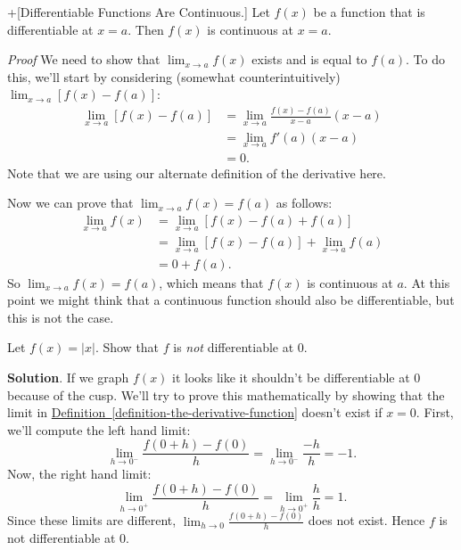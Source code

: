 \documentclass[10pt,]{book}
\makeatletter
\theoremstyle{ptxplainnotitle}
\theoremstyle{ptxplaintitle}
\theoremstyle{ptxplainnotitle}
\theoremstyle{ptxplaintitle}
\theoremstyle{ptxplainnotitle}
\theoremstyle{ptxplaintitle}
\renewcommand*{\proofname}{Proof}
\renewenvironment{proof}[1][\proofname]{\par
  \pushQED{\qed}%
  \normalfont \topsep6\p@\@plus6\p@\relax
  \trivlist
  \item\relax
    {\itshape
    #1\@addpunct{.}}\hspace\labelsep\ignorespaces
}{%
  \popQED\endtrivlist\@endpefalse
}
\theoremstyle{ptxdefinitionnotitle}
\theoremstyle{ptxdefinitiontitle}
\theoremstyle{ptxdefinitionnotitle}
\theoremstyle{ptxdefinitiontitle}
\theoremstyle{ptxdefinitionnotitle}
\theoremstyle{ptxdefinitiontitle}
\theoremstyle{ptxdefinitionnotitle}
\theoremstyle{ptxdefinitiontitle}
\theoremstyle{ptxdefinitionnotitle}
\theoremstyle{ptxdefinitiontitle}
\numberwithin{equation}{section}
\makeatother
\begin{document}
\begin{theorem}+[{Differentiable Functions Are Continuous.}]\label{theorem-differentiable-functions-are-continuous}
\hypertarget{p-109}{}%
Let \(f(x)\) be a function that is differentiable at \(x=a\). Then \(f(x)\) is continuous at \(x=a\).%
\end{theorem}
\begin{proof}\hypertarget{proof-1}{}
\hypertarget{p-110}{}%
We need to show that \(\lim_{x\to a}f(x)\) exists and is equal to \(f(a)\). To do this, we'll start by considering (somewhat counterintuitively) \(\lim_{x\to a}[f(x)-f(a)]\):%
\begin{align*}
\lim_{x\to a}[f(x)-f(a)] & = \lim_{x\to a}\frac{f(x)-f(a)}{x-a}(x-a) \\
& = \lim_{x\to a}f'(a)(x-a) \\
& = 0. 
\end{align*}
Note that we are using our alternate definition of the derivative here.%
\par
\hypertarget{p-111}{}%
Now we can prove that \(\lim_{x\to a}f(x) = f(a)\) as follows:%
\begin{align*}
\lim_{x\to a}f(x) & = \lim_{x\to a}[f(x) - f(a) + f(a)] \\
& = \lim_{x\to a}[f(x)-f(a)] + \lim_{x\to a}f(a) \\
& = 0 + f(a). 
\end{align*}
So \(\lim_{x\to a}f(x) = f(a)\), which means that \(f(x)\) is continuous at \(a\).%
\end{proof}
\hypertarget{p-112}{}%
At this point we might think that a continuous function should also be differentiable, but this is not the case.%
\begin{example}\label{example-a-continuous-function-that-is-not-differentiable-at-a-point}
\hypertarget{p-113}{}%
Let \(f(x) = |x|\). Show that \(f\) is \emph{not} differentiable at \(0\).%
\par\smallskip%
\noindent\textbf{Solution}.\hypertarget{solution-24}{}\quad%
\hypertarget{p-114}{}%
If we graph \(f(x)\) it looks like it shouldn't be differentiable at \(0\) because of the cusp. We'll try to prove this mathematically by showing that the limit in \hyperref[definition-the-derivative-function]{Definition~\ref{definition-the-derivative-function}} doesn't exist if \(x=0\). First, we'll compute the left hand limit:%
\begin{equation*}
\lim_{h\to0^{-}}\frac{f(0+h)-f(0)}{h} = \lim_{h\to0^{-}}\frac{-h}{h} = -1.
\end{equation*}
Now, the right hand limit:%
\begin{equation*}
\lim_{h\to0^{+}}\frac{f(0+h)-f(0)}{h} = \lim_{h\to0^{+}}\frac{h}{h} = 1.
\end{equation*}
Since these limits are different, \(\lim_{h\to0}\frac{f(0+h)-f(0)}{h}\) does not exist. Hence \(f\) is not differentiable at \(0\).%
\end{example}
\end{document}
